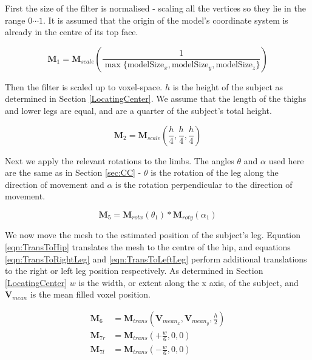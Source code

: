 \bigskip
First the size of the filter is normalised - scaling all the vertices so they lie in the range ${0 \cdots 1}$.
It is assumed that the origin of the model's coordinate system is already in the centre of its top face.

\begin{equation}
	\mathbf{M}_{1} = \mathbf{M}_{scale}\left( \frac{1}{\max \{\text{modelSize}_{x}, \text{modelSize}_{y}, \text{modelSize}_{z} \}}\right)
\end{equation}

Then the filter is scaled up to voxel-space.
$h$ is the height of the subject as determined in Section \ref{LocatingCenter}.
We assume that the length of the thighs and lower legs are equal, and are a quarter of the subject's total height.

\begin{equation}
	\mathbf{M}_{2} = \mathbf{M}_{scale}(\frac{h}{4}, \frac{h}{4}, \frac{h}{4})
\end{equation}

Next we apply the relevant rotations to the limbs.
The angles $\theta$ and $\alpha$ used here are the same as in Section \ref{sec:CC} -
$\theta$ is the rotation of the leg along the direction of movement and $\alpha$ is the rotation perpendicular to the direction of movement.

\begin{equation}
	\mathbf{M}_{5} = \mathbf{M}_{rotx}(\theta_{1}) * \mathbf{M}_{roty}(\alpha_{1})
\end{equation}

We now move the mesh to the estimated position of the subject's leg.
Equation \ref{eqn:TransToHip} translates the mesh to the centre of the hip, and equations \ref{eqn:TransToRightLeg} and \ref{eqn:TransToLeftLeg} perform additional
translations to the right or left leg position respectively.
As determined in Section \ref{LocatingCenter} $w$ is the width, or extent along the x axis, of the subject,
and $\mathbf{V}_{mean}$ is the mean filled voxel position.

\begin{align}
	\label{eqn:TransToHip}      \mathbf{M}_{6}  &= \mathbf{M}_{trans}\left( \mathbf{V}_{mean_{x}}, \mathbf{V}_{mean_{y}}, \frac{h}{2}\right) \\
	\label{eqn:TransToRightLeg} \mathbf{M}_{7r} &= \mathbf{M}_{trans}\left( +\frac{w}{6}, 0, 0\right) \\
	\label{eqn:TransToLeftLeg}  \mathbf{M}_{7l} &= \mathbf{M}_{trans}\left( -\frac{w}{6}, 0, 0\right)
\end{align}

